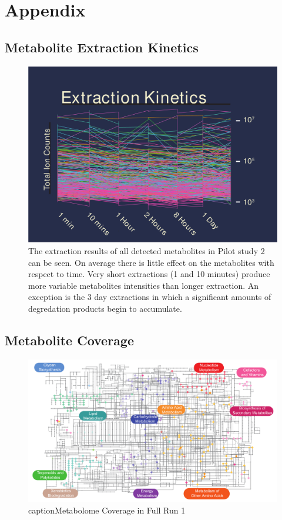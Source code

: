 \documentclass[a4paper]{book}
\begin{document}
\chapter{Appendix}
\begin{subappendices}

	\section{Metabolite Extraction Kinetics}
\begin{figure}[hbt!]
	\includegraphics[width=\linewidth]{Appendix_FIgures/Extraction_Kinetics_1.pdf}
	\caption{The extraction results of all detected metabolites in Pilot study 2 can be seen. On average there is little effect on the metabolites with respect to time. Very short extractions (1 and 10 minutes) produce more variable metabolites intensities than longer extraction. An exception is the 3 day extractions in which a significant amounts of degredation products begin to accumulate.}
	\label{appendix: Extraction Kinetics Traces}
\end{figure}

\clearpage

\section{Metabolite Coverage}
\begin{figure}[bht!]
	\includegraphics[width=\linewidth]{3.Metabolomics/Coverage.pdf}
	caption{Metabolome Coverage in Full Run 1}
	\label{appendix:Metabolome Coverage}


\end{figure}
\end{subappendices}
\end{document}
